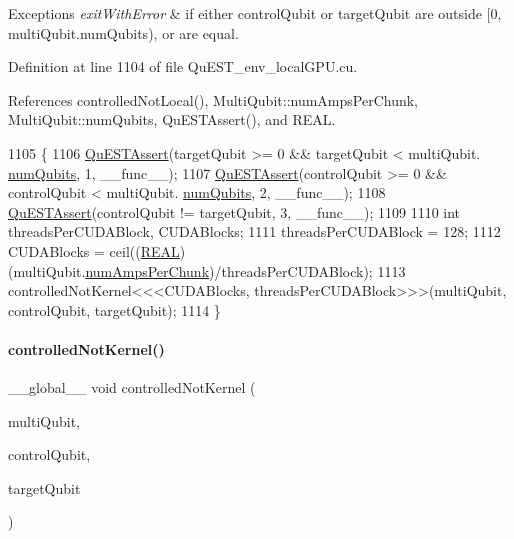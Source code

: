 \begin{DoxyExceptions}{Exceptions}
{\em exit\+With\+Error} & if either {\ttfamily control\+Qubit} or {\ttfamily target\+Qubit} are outside \mbox{[}0, {\ttfamily multi\+Qubit.\+num\+Qubits}), or are equal. \\
\hline
\end{DoxyExceptions}


Definition at line 1104 of file Qu\+E\+S\+T\+\_\+env\+\_\+local\+G\+P\+U.\+cu.



References controlled\+Not\+Local(), Multi\+Qubit\+::num\+Amps\+Per\+Chunk, Multi\+Qubit\+::num\+Qubits, Qu\+E\+S\+T\+Assert(), and R\+E\+AL.


\begin{DoxyCode}
1105 \{
1106     \mbox{\hyperlink{QuEST__env__localGPU_8cu_a3587b9d533e633ccf1abf9ad2ce45d8d}{QuESTAssert}}(targetQubit >= 0 && targetQubit < multiQubit.
      \mbox{\hyperlink{structMultiQubit_ab5b9795bdc6fb5855e1974dcbbaeb36f}{numQubits}}, 1, \_\_func\_\_);
1107     \mbox{\hyperlink{QuEST__env__localGPU_8cu_a3587b9d533e633ccf1abf9ad2ce45d8d}{QuESTAssert}}(controlQubit >= 0 && controlQubit < multiQubit.
      \mbox{\hyperlink{structMultiQubit_ab5b9795bdc6fb5855e1974dcbbaeb36f}{numQubits}}, 2, \_\_func\_\_);
1108     \mbox{\hyperlink{QuEST__env__localGPU_8cu_a3587b9d533e633ccf1abf9ad2ce45d8d}{QuESTAssert}}(controlQubit != targetQubit, 3, \_\_func\_\_);
1109 
1110     \textcolor{keywordtype}{int} threadsPerCUDABlock, CUDABlocks;
1111     threadsPerCUDABlock = 128;
1112     CUDABlocks = ceil((\mbox{\hyperlink{QuEST__precision_8h_a4b654506f18b8bfd61ad2a29a7e38c25}{REAL}})(multiQubit.\mbox{\hyperlink{structMultiQubit_a1cad83601a78635dd278259c7ed54f18}{numAmpsPerChunk}})/threadsPerCUDABlock);
1113     controlledNotKernel<<<CUDABlocks, threadsPerCUDABlock>>>(multiQubit, controlQubit, targetQubit);
1114 \}
\end{DoxyCode}
\mbox{\label{QuEST__env__localGPU_8cu_a625723cfbffdde3b3b312f8573d530a3}} 
\paragraph{\texorpdfstring{controlled\+Not\+Kernel()}{controlledNotKernel()}}
{\footnotesize\ttfamily \+\_\+\+\_\+global\+\_\+\+\_\+ void controlled\+Not\+Kernel (\begin{DoxyParamCaption}\item[{\mbox{\hyperlink{structMultiQubit}{Multi\+Qubit}}}]{multi\+Qubit,  }\item[{const int}]{control\+Qubit,  }\item[{const int}]{target\+Qubit }\end{DoxyParamCaption})}



